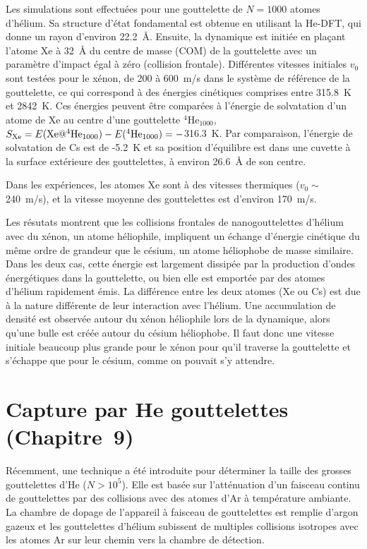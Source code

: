 		Les simulations sont effectuées pour une gouttelette de $N=1000$ atomes d'hélium. 
		Sa structure d'état fondamental est obtenue en utilisant la He-DFT, qui donne un rayon d'environ 22.2~\AA. 
		Ensuite, la dynamique est initiée en plaçant l'atome Xe à 32~\AA{}  du centre de masse (COM) de la gouttelette avec un paramètre d'impact égal à zéro (collision frontale). 
		Différentes  vitesses initiales $v_0$ sont testées pour le xénon,  de 200 à 600~m/s dans le système de référence de la gouttelette, ce qui correspond à des énergies cinétiques comprises entre 315.8~K et 2842~K. 
		Ces énergies peuvent être comparées à l'énergie de solvatation d'un atome de Xe au centre d'une gouttelette $^4$He$_{1000}$, $S_{{\rm Xe}}=E({\rm Xe}@^4{\rm He}_{1000})-E(^4{\rm He}_{1000})=-$316.3~K. 
		Par comparaison, l'énergie de solvatation de Cs est de -5.2~K et sa position d'équilibre est dans une cuvette à la surface extérieure des gouttelettes, à environ 26.6~\AA{} de son centre.
		
		Dans les expériences\citep{Gom14,Jon16}, les atomes Xe sont à des vitesses thermiques  ($v_0\!\!\sim$240~m/s), et la vitesse moyenne des gouttelettes est d'environ 170~m/s\citep{Gom11}.
		
		Les résutats montrent que les collisions frontales de nanogouttelettes d'hélium avec du xénon, un atome héliophile, impliquent un échange d'énergie cinétique du même ordre de grandeur que le césium, un atome héliophobe de masse similaire. 
		Dans les deux cas, cette énergie est largement dissipée par la production d'ondes énergétiques dans la gouttelette, ou bien elle est emportée par des atomes d'hélium rapidement émis. 
		La différence entre les deux atomes (Xe ou Cs) est due à la nature différente de leur interaction avec l'hélium. 
		Une accumulation de densité est observée autour du xénon héliophile lors de la dynamique, alors qu'une bulle est créée autour du césium héliophobe. 
		Il faut donc une vitesse initiale beaucoup plus grande pour le xénon pour qu'il traverse la gouttelette et s'échappe que pour le césium, comme on pouvait s'y attendre.
	
	\section*{Capture par He gouttelettes \small(Chapitre~9)}
		Récemment, une technique a été introduite pour déterminer la taille des grosses gouttelettes d'He ($N>10^5$). 
		Elle est basée sur l'atténuation d'un faisceau continu de gouttelettes par des collisions avec des atomes d'Ar à température ambiante\citep{Gom11}. 
		La chambre de dopage de l'appareil à faisceau de gouttelettes est remplie d'argon gazeux et les gouttelettes d'hélium subissent de multiples collisions isotropes avec les atomes Ar sur leur chemin vers la chambre de détection.
		
